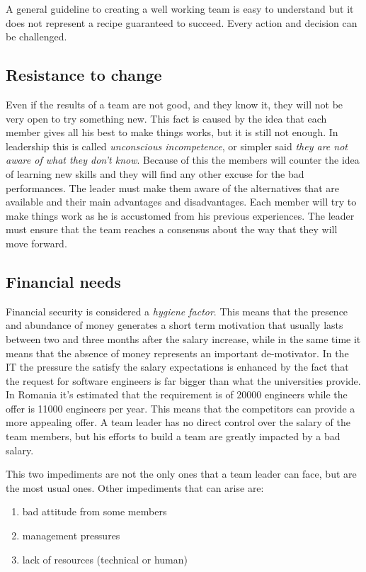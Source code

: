 
A general guideline to creating a well working team is easy to understand but it does not represent a recipe guaranteed to succeed. Every action and decision can be challenged.

\subsection{Resistance to change}
Even if the results of a team are not good, and they know it, they will not be very open to try something new. This fact is caused by the idea that each member gives all his best to make things works, but it is still not enough. In leadership this is called \textit{unconscious incompetence}, or simpler said \textit{they are not aware of what they don't know}. Because of this the members will counter the idea of learning new skills and they will find any other excuse for the bad performances. The leader must make them aware of the alternatives that are available and their main advantages and disadvantages. Each member will try to make things work as he is accustomed from his previous experiences. The leader must ensure that the team reaches a consensus about the way that they will move forward. 
 
\subsection{Financial needs}
Financial security is considered a \textit{hygiene factor}. This means that the presence and abundance of money generates a short term motivation that usually lasts between two and three months after the salary increase, while in the same time it means that the absence of money represents an important de-motivator. In the IT the pressure the satisfy the salary expectations is enhanced by the fact that the request for software engineers is far bigger than what the universities provide. In Romania it's estimated that the requirement is of 20000 engineers while the offer is 11000 engineers per year. This means that the competitors can provide a more appealing offer. A team leader has no direct control over the salary of the team members, but his efforts to build a team are greatly impacted by a bad salary.

This two impediments are not the only ones that a team leader can face, but are the most usual ones. Other impediments that can arise are:

\begin{enumerate}
\item bad attitude from some members
\item management pressures
\item lack of resources (technical or human)
\end{enumerate}